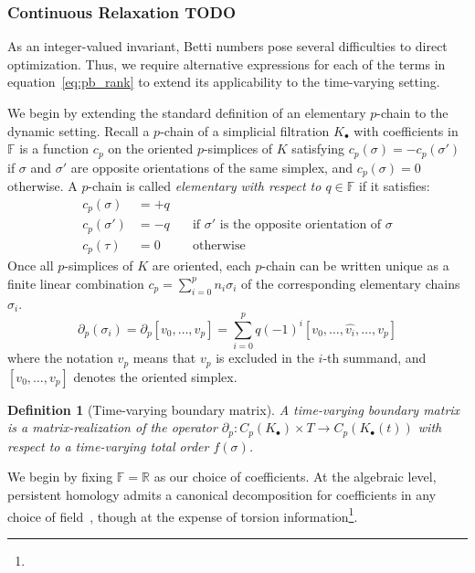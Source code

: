\documentclass[10pt]{article}
\newtheorem{definition}{Definition}
\begin{document}
\subsubsection*{Continuous Relaxation TODO}
As an integer-valued invariant, Betti numbers pose several difficulties to direct optimization. Thus, we require alternative expressions for each of the terms in equation~\eqref{eq:pb_rank} to extend its applicability to the time-varying setting.

We begin by extending the standard definition of an elementary $p$-chain to the dynamic setting. Recall a $p$-chain of a simplicial filtration $K_\bullet$ with coefficients in $\mathbb{F}$ is a function $c_p$ on the oriented $p$-simplices of $K$ satisfying $c_p(\sigma) = -c_p(\sigma')$ if $\sigma$ and $\sigma'$ are opposite orientations of the same simplex, and $c_p(\sigma) = 0$ otherwise. 
A $p$-chain is called \emph{elementary with respect to $q \in \mathbb{F}$} if it satisfies:
\begin{align*}
	c_p(\sigma) &= +q  \quad & \\
	c_p(\sigma') &= -q \quad &\text{if } \sigma' \text{ is the opposite orientation of }\sigma \\
	c_p(\tau) &= 0 \quad & \text{otherwise}
\end{align*}
Once all $p$-simplices of $K$ are oriented, each $p$-chain can be written unique as a finite linear combination $c_p = \sum_{i=0}^p n_i \sigma_i$ 
of the corresponding elementary chains $\sigma_i$. 
\begin{equation}
	\partial_p(\sigma_i) = \partial_p[ v_0, \dots, v_p ] = \sum\limits_{i = 0}^p q(-1)^i [v_0, \dots, \hat{v_i}, \dots, v_p]
\end{equation}
where the notation $\hat{v}_p$ means that $v_p$ is excluded in the $i$-th summand, and $[v_0, \dots, v_p]$ denotes the oriented simplex. 
\begin{definition}[Time-varying boundary matrix]
A time-varying boundary matrix is a matrix-realization of the operator $\partial_p : C_p(K_\bullet) \times T \to C_p(K_\bullet(t))$ with respect to a time-varying total order $f(\sigma)$. 
\end{definition}

We begin by fixing $\mathbb{F} = \mathbb{R}$ as our choice of coefficients. At the algebraic level, persistent homology admits a canonical decomposition for coefficients in any choice of field~\cite{}, though at the expense of torsion information\footnote{}.  
\end{document}
